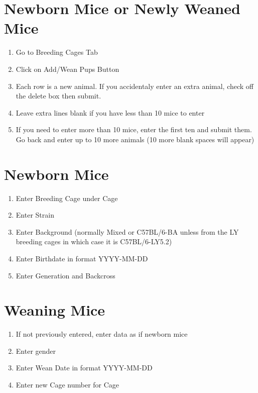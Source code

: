 \documentclass[letterpaper,10pt,english]{sphinxmanual}
\begin{document}
\section{Newborn Mice or Newly Weaned Mice}
\label{usage:newborn-mice-or-newly-weaned-mice}\begin{enumerate}
\item {} 
Go to Breeding Cages Tab

\item {} 
Click on Add/Wean Pups Button

\item {} 
Each row is a new animal.  If you accidentaly enter an extra animal, check off the delete box then submit.

\item {} 
Leave extra lines blank if you have less than 10 mice to enter

\item {} 
If you need to enter more than 10 mice, enter the first ten and submit them.  Go back and enter up to 10 more animals (10 more blank spaces will appear)

\end{enumerate}


\section{Newborn Mice}
\label{usage:newborn-mice}\begin{enumerate}
\item {} 
Enter Breeding Cage under Cage

\item {} 
Enter Strain

\item {} 
Enter Background (normally Mixed or C57BL/6-BA unless from the LY breeding cages in which case it is C57BL/6-LY5.2)

\item {} 
Enter Birthdate in format YYYY-MM-DD

\item {} 
Enter Generation and Backcross

\end{enumerate}


\section{Weaning Mice}
\label{usage:weaning-mice}\begin{enumerate}
\item {} 
If not previously entered, enter data as if newborn mice

\item {} 
Enter gender

\item {} 
Enter Wean Date in format YYYY-MM-DD

\item {} 
Enter new Cage number for Cage

\end{enumerate}
\end{document}
